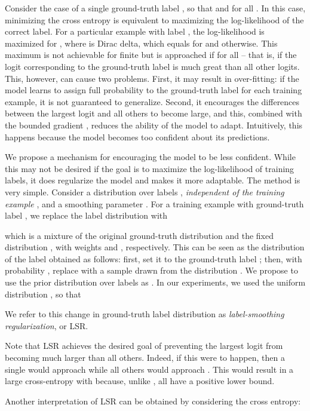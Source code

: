 \documentclass[10pt,twocolumn,letterpaper]{article}
\begin{document}
Consider the case of a single ground-truth label , so that  and
 for all . In this case, minimizing the cross entropy is
equivalent to maximizing the log-likelihood of the correct label. For a
particular example  with label , the log-likelihood is maximized for , where  is Dirac delta, which equals  for 
and  otherwise. This maximum is not achievable for finite  but is
approached if  for all  -- that is, if the logit
corresponding to the ground-truth label is much great than all other
logits. This, however, can cause two problems. First, it may result in
over-fitting: if the model learns to assign full probability to the ground-truth
label for each training example, it is not guaranteed to generalize. Second, it
encourages the differences between the largest logit and all others to become
large, and this, combined with the bounded gradient
, reduces the ability of the model to
adapt. Intuitively, this happens because the model becomes too confident about
its predictions.

We propose a mechanism for encouraging the model to be less confident. While
this may not be desired if the goal is to maximize the log-likelihood of
training labels, it does regularize the model and makes it more adaptable. The
method is very simple. Consider a distribution over labels , {\em
  independent of the training example }, and a smoothing parameter .
 For a training example with ground-truth label , we
replace the label distribution  with

which is a mixture of the original ground-truth distribution  and the
fixed distribution , with weights  and ,
respectively. This can be seen as the distribution of the label  obtained as
follows: first, set it to the ground-truth label ; then, with probability
, replace  with a sample drawn from the distribution . We
propose to use the prior distribution over labels as . In our experiments,
we used the uniform distribution , so that

We refer to this change in ground-truth label distribution as {\em
  label-smoothing regularization}, or LSR.

Note that LSR achieves the desired goal of preventing the largest logit from
becoming much larger than all others. Indeed, if this were to happen, then a
single  would approach  while all others would approach . This would
result in a large cross-entropy with  because, unlike
, all  have a positive lower bound.

Another interpretation of LSR can be obtained by considering the cross entropy:
\end{document}
